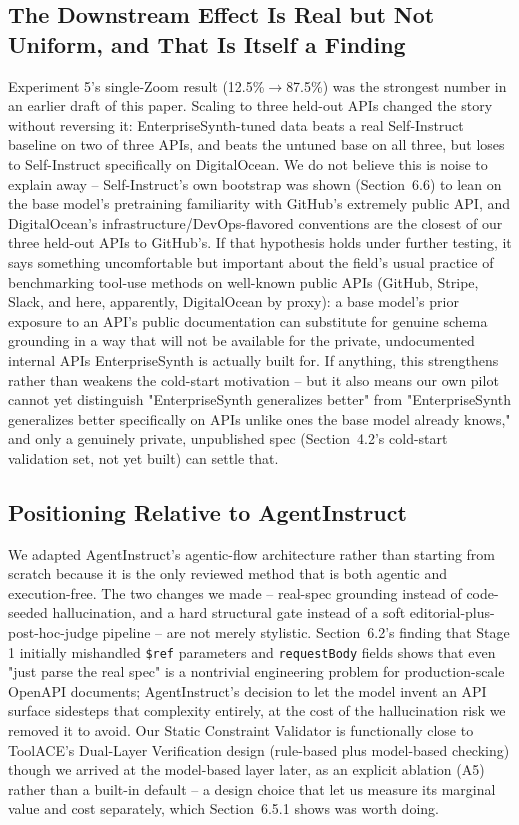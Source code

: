 \documentclass[11pt]{article}
\begin{document}
\subsection{The Downstream Effect Is Real but Not Uniform, and That Is Itself a Finding}
Experiment 5's single-Zoom result (12.5\%$\rightarrow$87.5\%) was the strongest number in an
earlier draft of this paper. Scaling to three held-out APIs changed the story without reversing
it: EnterpriseSynth-tuned data beats a real Self-Instruct baseline on two of three APIs, and beats
the untuned base on all three, but loses to Self-Instruct specifically on DigitalOcean. We do not
believe this is noise to explain away -- Self-Instruct's own bootstrap was shown (Section~6.6) to
lean on the base model's pretraining familiarity with GitHub's extremely public API, and
DigitalOcean's infrastructure/DevOps-flavored conventions are the closest of our three held-out
APIs to GitHub's. If that hypothesis holds under further testing, it says something uncomfortable
but important about the field's usual practice of benchmarking tool-use methods on well-known
public APIs (GitHub, Stripe, Slack, and here, apparently, DigitalOcean by proxy): a base model's
prior exposure to an API's public documentation can substitute for genuine schema grounding in a
way that will not be available for the private, undocumented internal APIs EnterpriseSynth is
actually built for. If anything, this strengthens rather than weakens the cold-start motivation --
but it also means our own pilot cannot yet distinguish "EnterpriseSynth generalizes better" from
"EnterpriseSynth generalizes better specifically on APIs unlike ones the base model already knows,"
and only a genuinely private, unpublished spec (Section~4.2's cold-start validation set, not yet
built) can settle that.

\subsection{Positioning Relative to AgentInstruct}
We adapted AgentInstruct's agentic-flow architecture rather than starting from scratch because it
is the only reviewed method that is both agentic and execution-free. The two changes we made --
real-spec grounding instead of code-seeded hallucination, and a hard structural gate instead of a
soft editorial-plus-post-hoc-judge pipeline -- are not merely stylistic. Section~6.2's finding that
Stage 1 initially mishandled \texttt{\$ref} parameters and \texttt{requestBody} fields shows that
even "just parse the real spec" is a nontrivial engineering problem for production-scale OpenAPI
documents; AgentInstruct's decision to let the model invent an API surface sidesteps that
complexity entirely, at the cost of the hallucination risk we removed it to avoid. Our Static
Constraint Validator is functionally close to ToolACE's Dual-Layer Verification design (rule-based
plus model-based checking) though we arrived at the model-based layer later, as an explicit
ablation (A5) rather than a built-in default -- a design choice that let us measure its marginal
value and cost separately, which Section~6.5.1 shows was worth doing.
\end{document}
